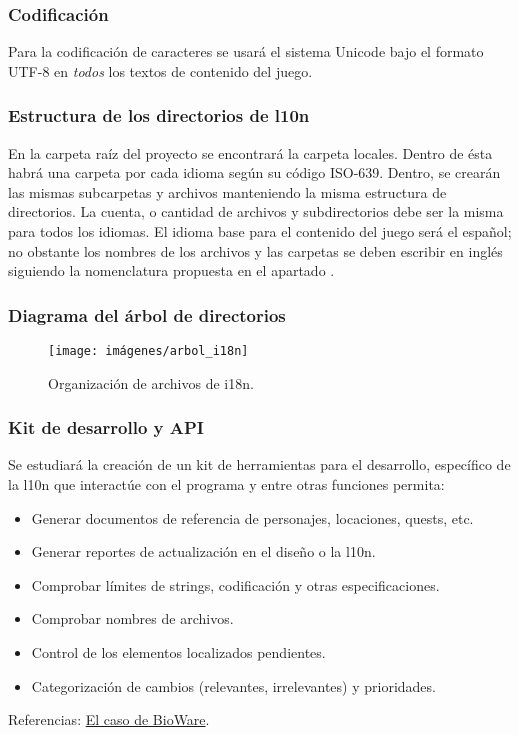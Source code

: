 \subsubsection{Codificación}\label{i18n:codificacion}
Para la codificación de caracteres se usará el sistema Unicode bajo el formato UTF-8 en \emph{todos} los textos de contenido del juego.

\subsubsection{Estructura de los directorios de l10n}
En la carpeta raíz del proyecto se encontrará la carpeta locales. Dentro de ésta habrá una carpeta por cada idioma según su código ISO-639. Dentro, se crearán las mismas subcarpetas y archivos manteniendo la misma estructura de directorios. La cuenta, o cantidad de archivos y subdirectorios debe ser la misma para todos los idiomas. El idioma base para el contenido del juego será el español; no obstante los nombres de los archivos y las carpetas se deben escribir en inglés siguiendo la nomenclatura propuesta en el apartado .

\subsubsection{Diagrama del árbol de directorios}\label{i18n:arbol-de-directorios}

\begin{figure}[H]
	\centering
	\texttt{[image: imágenes/arbol\_i18n]}
	\caption{Organización de archivos de i18n.}
	\label{fig:arbolinternacionalizacion}
\end{figure}

\subsubsection{Kit de desarrollo y API}\label{i18n:toolkit-y-api}
Se estudiará la creación de un kit de herramientas para el desarrollo, específico de la l10n que interactúe con el programa y entre otras funciones permita:
\begin{itemize}
	\item Generar documentos de referencia de personajes, locaciones, quests, etc.
	\item Generar reportes de actualización en el diseño o la l10n.
	\item Comprobar límites de strings, codificación y otras especificaciones.
	\item Comprobar nombres de archivos.
	\item Control de los elementos localizados pendientes.
	\item Categorización de cambios (relevantes, irrelevantes) y prioridades.
\end{itemize}
Referencias: \href{https://drive.google.com/file/d/1OJxibGWbvxJq3_8WwmR93yzCCCvq7iu-/view?usp=sharing}{El caso de BioWare}.

